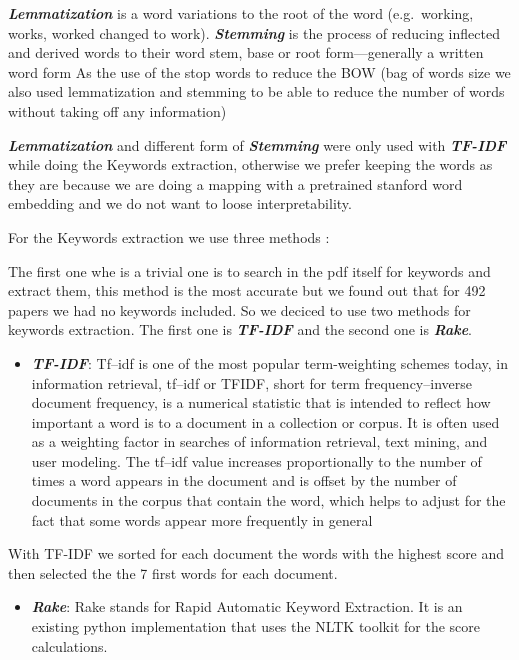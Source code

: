 \documentclass[journal,twocolumn]{IEEEtran}
\providecommand{\tightlist}{%
      \setlength{\itemsep}{0pt}\setlength{\parskip}{0pt}}
\begin{document}
\textbf{\emph{Lemmatization}} is a word variations to the root of the
word (e.g.~working, works, worked changed to work).
\textbf{\emph{Stemming}} is the process of reducing inflected and
derived words to their word stem, base or root form---generally a
written word form As the use of the stop words to reduce the BOW (bag of
words size we also used lemmatization and stemming to be able to reduce
the number of words without taking off any information)

    \textbf{\emph{Lemmatization}} and different form of
\textbf{\emph{Stemming}} were only used with \textbf{\emph{TF-IDF}}
while doing the Keywords extraction, otherwise we prefer keeping the
words as they are because we are doing a mapping with a pretrained
stanford word embedding and we do not want to loose interpretability.

    For the Keywords extraction we use three methods :

The first one whe is a trivial one is to search in the pdf itself for
keywords and extract them, this method is the most accurate but we found
out that for 492 papers we had no keywords included. So we deciced to
use two methods for keywords extraction. The first one is
\textbf{\emph{TF-IDF}} and the second one is \textbf{\emph{Rake}}.

    \begin{itemize}
\tightlist
\item
  \textbf{\emph{TF-IDF}}: Tf--idf is one of the most popular
  term-weighting schemes today, in information retrieval, tf--idf or
  TFIDF, short for term frequency--inverse document frequency, is a
  numerical statistic that is intended to reflect how important a word
  is to a document in a collection or corpus. It is often used as a
  weighting factor in searches of information retrieval, text mining,
  and user modeling. The tf--idf value increases proportionally to the
  number of times a word appears in the document and is offset by the
  number of documents in the corpus that contain the word, which helps
  to adjust for the fact that some words appear more frequently in
  general \cite{Tf-idf}
\end{itemize}

    With TF-IDF we sorted for each document the words with the highest score
and then selected the the 7 first words for each document.

    \begin{itemize}
\tightlist
\item
  \textbf{\emph{Rake}}: Rake stands for Rapid Automatic Keyword
  Extraction. It is an existing python implementation that uses the NLTK
  toolkit for the score calculations.
\end{itemize}
\end{document}

